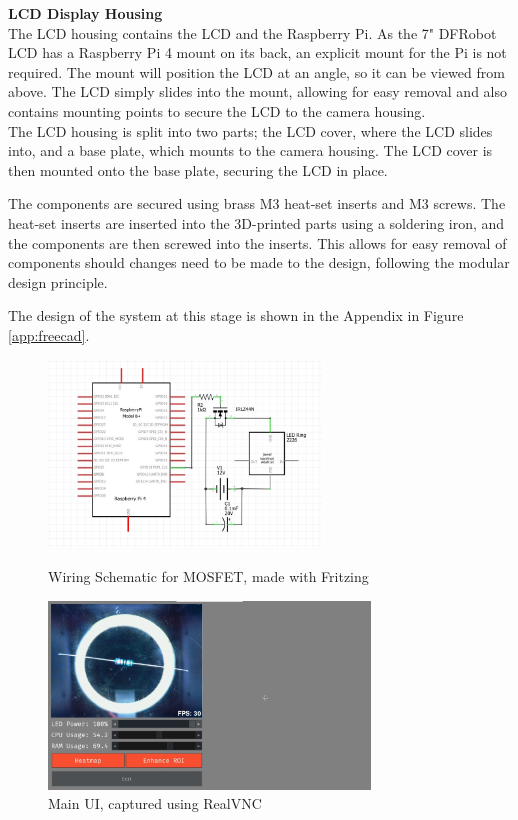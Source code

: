 \noindent
\textbf{LCD Display Housing}
\label{sec:lcdhousing} \\
The LCD housing contains the LCD and the Raspberry Pi. As the 7" DFRobot LCD has a Raspberry Pi 4 mount on its back,
an explicit mount for the Pi is not required. The mount will position the LCD at an angle, so it can be viewed from above. The LCD
simply slides into the mount, allowing for easy removal and also contains mounting points to secure the LCD to the camera housing. \\
The LCD housing is split into two parts; the LCD cover, where the LCD slides into, and a base plate, which mounts to the camera housing.
The LCD cover is then mounted onto the base plate, securing the LCD in place.

The components are secured using brass M3 heat-set inserts and M3 screws. The heat-set inserts are inserted into the 3D-printed parts using a soldering iron,
and the components are then screwed into the inserts. This allows for easy removal of components should changes need to be made to the design, following
the modular design principle.

The design of the system at this stage is shown in the Appendix in Figure \ref{app:freecad}.
\begin{figure}
    \begin{minipage}[t]{0.49\textwidth}
      \centering
      \includegraphics[width=\textwidth,height=5cm, keepaspectratio]{imgs/diagrams/wiring.jpg}
      \caption{Wiring Schematic for MOSFET, made with Fritzing\cite{fritzing}}
      \label{fig:wiringschematic}
    \end{minipage}
    \hfill
    \begin{minipage}[t]{0.49\textwidth}
        \centering
        \includegraphics[width=\textwidth,height=5cm, keepaspectratio]{imgs/software/realvnc.jpg}
        \caption{Main UI, captured using RealVNC\cite{realvnc}}
        \label{fig:mainui}
    \end{minipage}
  \end{figure}
  